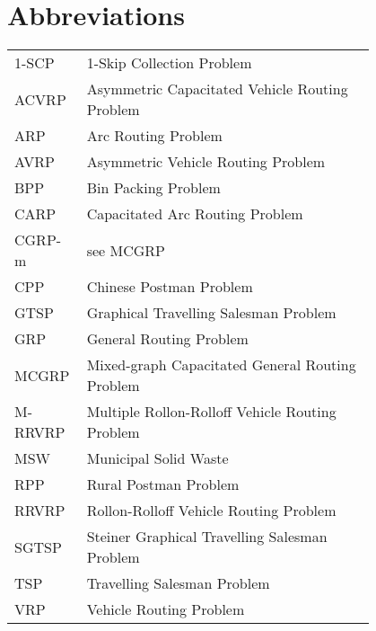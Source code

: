 \chapter*{Abbreviations}

\begin{flushleft}
\begin{tabular}{l p{0.8\linewidth}}
1-SCP	& 1-Skip Collection Problem \\
ACVRP	& Asymmetric Capacitated Vehicle Routing Problem \\
ARP	& Arc Routing Problem \\
AVRP	& Asymmetric Vehicle Routing Problem \\
BPP	& Bin Packing Problem \\
CARP	& Capacitated Arc Routing Problem \\
CGRP-m	& see MCGRP \\
CPP	& Chinese Postman Problem \\
GTSP	& Graphical Travelling Salesman Problem \\
GRP	& General Routing Problem \\
MCGRP	& Mixed-graph Capacitated General Routing Problem \\
M-RRVRP	& Multiple Rollon-Rolloff Vehicle Routing Problem \\
MSW	& Municipal Solid Waste \\
RPP	& Rural Postman Problem \\
RRVRP	& Rollon-Rolloff Vehicle Routing Problem \\
SGTSP	& Steiner Graphical Travelling Salesman Problem \\
TSP	& Travelling Salesman Problem \\
VRP	& Vehicle Routing Problem \\
\end{tabular}
\end{flushleft}

